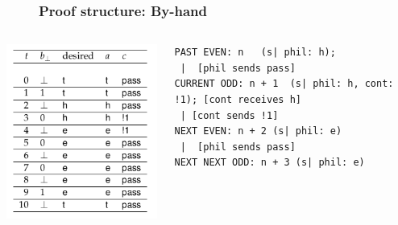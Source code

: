 \documentclass{beamer}
\begin{document}
\begin{frame}[fragile]
\begin{figure}[H]
\centering
\frametitle{Proof structure: By-hand}
\end{figure}
\begin{columns}[T]

\begin{column}{0.3\textwidth}
\includegraphics[width=\textwidth]{table-3.png}
\end{column}
\begin{column}{0.7\textwidth}

{\tiny
\begin{verbatim}
PAST EVEN: n   (s| phil: h);
 |  [phil sends pass]
CURRENT ODD: n + 1  (s| phil: h, cont: !1); [cont receives h]
 | [cont sends !1]
NEXT EVEN: n + 2 (s| phil: e)
 |  [phil sends pass]
NEXT NEXT ODD: n + 3 (s| phil: e)
\end{verbatim}
}
\end{column}
\end{columns}
\end{frame}
\end{document}
